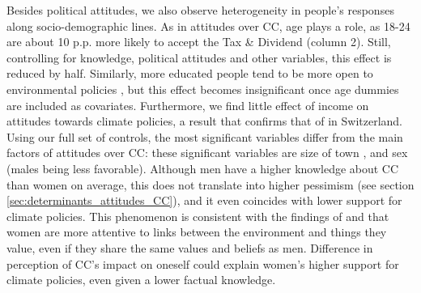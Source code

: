 \documentclass[english,5p,authoryear]{elsarticle}
\begin{document}
Besides political attitudes, we also observe heterogeneity in people's responses along socio-demographic lines. As in attitudes over CC, age plays a role, as 18-24 are about 10 p.p. more likely to accept the Tax \& Dividend (column 2). Still, controlling for knowledge, political attitudes and other variables, this effect is reduced by half. Similarly, more educated people tend to be more open to environmental policies \citep[as previously found by][]{thalmann_public_2004}, but this effect becomes insignificant once age dummies are included as covariates. Furthermore, we find little effect of income on attitudes towards climate policies, a result that confirms that of \citet{thalmann_public_2004} in Switzerland. Using our full set of controls, the most significant variables differ from the main factors of attitudes over CC: these significant variables are size of town \citep[city dwellers being more favorable to environmental policies, as in][]{thalmann_public_2004}, and sex (males being less favorable). Although men have a higher knowledge about CC than women on average, this does not translate into higher pessimism (see section \ref{sec:determinants_attitudes_CC}), and it even coincides with lower support for climate policies. This phenomenon is consistent with the findings of \citet{stern_value_1993} and \citet{hampel_gender_1996} that women are more attentive to links between the environment and things they value, even if they share the same values and beliefs as men. Difference in perception of CC's impact on oneself could explain women's higher support for climate policies, even given a lower factual knowledge. %


\end{document}
